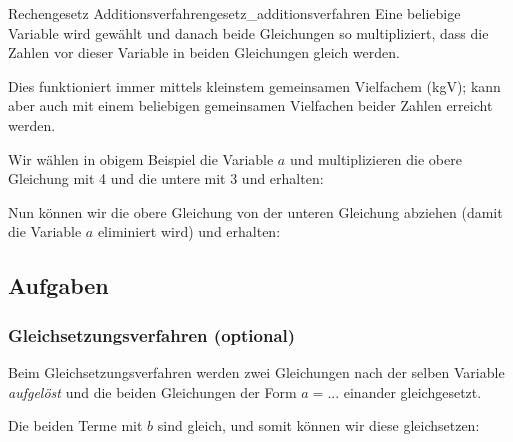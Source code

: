 
  \begin{rezept}{Rechengesetz Additionsverfahren}{gesetz_additionsverfahren}
    Eine beliebige Variable wird gewählt und danach beide Gleichungen so multipliziert,
    dass die Zahlen vor dieser Variable in beiden Gleichungen gleich werden.

    Dies funktioniert
    immer mittels kleinstem gemeinsamen Vielfachem (kgV); kann aber auch mit
    einem beliebigen gemeinsamen Vielfachen beider Zahlen erreicht werden.
  \end{rezept}

Wir wählen \zB in obigem Beispiel die Variable $a$ und multiplizieren die obere Gleichung mit 4 und die untere mit 3 und
erhalten:



  Nun können wir die obere Gleichung von der unteren Gleichung abziehen (damit die Variable $a$ eliminiert wird)
und erhalten:
\newpage


\subsection*{Aufgaben}

\newpage


\subsubsection{Gleichsetzungsverfahren (optional)}\label{lin_gl_gleichsetzungsverfahren}
Beim Gleichsetzungsverfahren werden zwei Gleichungen nach der selben Variable \textit{aufgelöst} und die beiden Gleichungen der Form $a = ...$ einander gleichgesetzt.




Die beiden Terme mit $b$ sind gleich, und somit können wir diese gleichsetzen:


